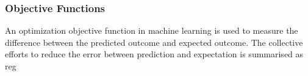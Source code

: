 \subsubsection{Objective Functions}
An optimization objective function in machine learning is used to measure the difference between the predicted outcome and expected outcome. The collective efforts to reduce the error between prediction and expectation is summarised as reg